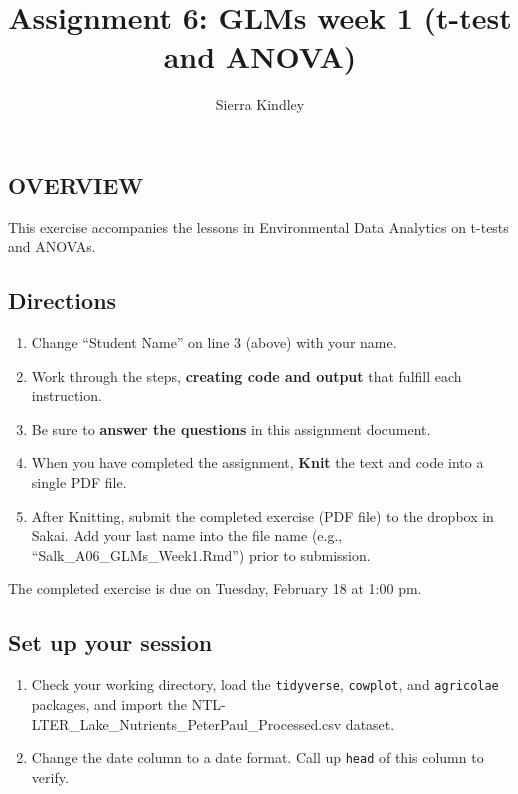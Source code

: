 \documentclass[
]{article}
\title{Assignment 6: GLMs week 1 (t-test and ANOVA)}
\author{Sierra Kindley}
\date{}
\providecommand{\tightlist}{%
  \setlength{\itemsep}{0pt}\setlength{\parskip}{0pt}}
\begin{document}
\maketitle

\hypertarget{overview}{%
\subsection{OVERVIEW}\label{overview}}

This exercise accompanies the lessons in Environmental Data Analytics on
t-tests and ANOVAs.

\hypertarget{directions}{%
\subsection{Directions}\label{directions}}

\begin{enumerate}
\def\labelenumi{\arabic{enumi}.}
\tightlist
\item
  Change ``Student Name'' on line 3 (above) with your name.
\item
  Work through the steps, \textbf{creating code and output} that fulfill
  each instruction.
\item
  Be sure to \textbf{answer the questions} in this assignment document.
\item
  When you have completed the assignment, \textbf{Knit} the text and
  code into a single PDF file.
\item
  After Knitting, submit the completed exercise (PDF file) to the
  dropbox in Sakai. Add your last name into the file name (e.g.,
  ``Salk\_A06\_GLMs\_Week1.Rmd'') prior to submission.
\end{enumerate}

The completed exercise is due on Tuesday, February 18 at 1:00 pm.

\hypertarget{set-up-your-session}{%
\subsection{Set up your session}\label{set-up-your-session}}

\begin{enumerate}
\def\labelenumi{\arabic{enumi}.}
\item
  Check your working directory, load the \texttt{tidyverse},
  \texttt{cowplot}, and \texttt{agricolae} packages, and import the
  NTL-LTER\_Lake\_Nutrients\_PeterPaul\_Processed.csv dataset.
\item
  Change the date column to a date format. Call up \texttt{head} of this
  column to verify.
\end{enumerate}
\end{document}
